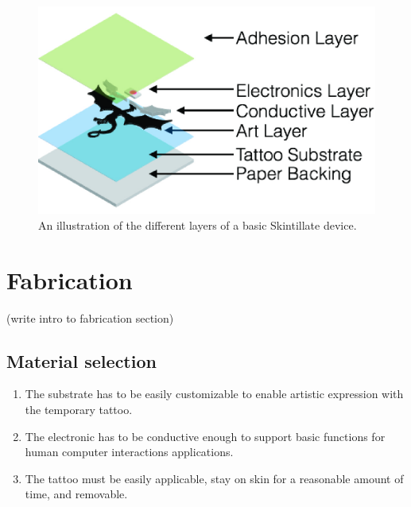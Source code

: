 \documentclass{sigchi}
\begin{document}
\begin{figure}
\centering
\includegraphics[width=0.9\columnwidth]{figures/Figure4}
\caption{An illustration of the different layers of a basic Skintillate device.}
\vspace{-8pt}
\label{fig:layers}
\end{figure}
 

\section{Fabrication}
(write intro to fabrication section)
\subsection{Material selection}
\begin{enumerate}
  \item The substrate has to be easily customizable to enable artistic expression with the temporary tattoo.
  \item The electronic has to be conductive enough to support basic functions for human computer interactions applications. 
  \item The tattoo must be easily applicable, stay on skin for a reasonable amount of time, and removable.
\end{enumerate}
\end{document}
